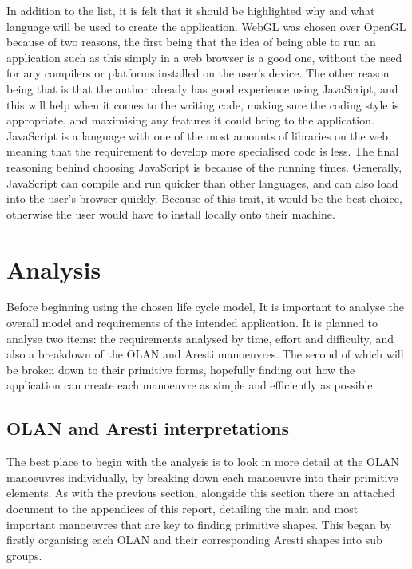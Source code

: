 In addition to the list, it is felt that it should be highlighted why and what language will be used to create the application. WebGL was chosen over OpenGL because of two reasons, the first being that the idea of being able to run an application such as this simply in a web browser is a good one, without the need for any compilers or platforms installed on the user's device. The other reason being that is that the author already has good experience using JavaScript, and this will help when it comes to the writing code, making sure the coding style is appropriate, and maximising any features it could bring to the application. JavaScript is a language with one of the most amounts of libraries on the web, meaning that the requirement to develop more specialised code is less. The final reasoning behind choosing JavaScript is because of the running times. Generally, JavaScript can compile and run quicker than other languages, and can also load into the user’s browser quickly. Because of this trait, it would be the best choice, otherwise the user would have to install locally onto their machine.

\section{Analysis}
Before beginning using the chosen life cycle model, It is important to analyse the overall model and requirements of the intended application. It is planned to analyse two items: the requirements analysed by time, effort and difficulty, and also a breakdown of the OLAN and Aresti manoeuvres. The second of which will be broken down to their primitive forms, hopefully finding out how the application can create each manoeuvre as simple and efficiently as possible.

\subsection{OLAN and Aresti interpretations}
The best place to begin with the analysis is to look in more detail at the OLAN manoeuvres individually, by breaking down each manoeuvre into their primitive elements. As with the previous section, alongside this section there an attached document to the appendices of this report, detailing the main and most important manoeuvres that are key to finding primitive shapes. This began by firstly organising each OLAN and their corresponding Aresti shapes into sub groups. 

